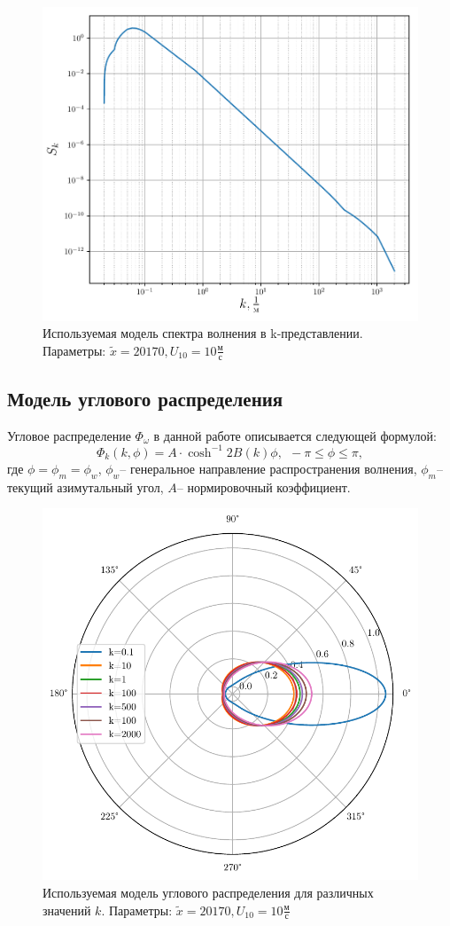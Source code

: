 \begin{figure}[h!]
	\centering
	\includegraphics[width=0.7\linewidth]{fig/full_spectrum}
	\caption{Используемая модель спектра волнения в k-представлении. 
	Параметры: $\tilde x=20170, U_{10}=10 \frac{\text{м}}{\text{с}}$}
	\label{fig:full_spectrum}
\end{figure}
\subsection{Модель углового распределения}
Угловое распределение $\Phi_{\omega}$ в данной работе описывается следующей формулой:
\begin{equation}
	\Phi_{k} (k, \phi)= A\cdot \cosh^{-1}{2B(k) \phi}, ~~ -\pi\leq \phi \leq \pi,
\end{equation}
где $\phi=\phi_m = \phi_w$, $\phi_w$-- генеральное направление распространения волнения,
$\phi_m$-- текущий азимутальный угол, $A$-- нормировочный коэффициент.


\begin{figure}[h!]
	\centering
	\includegraphics[width=0.7\linewidth]{fig/full_angles}
	\caption{Используемая модель  углового распределения для различных значений $k$. 
	Параметры: $\tilde x=20170, U_{10}=10 \frac{\text{м}}{\text{с}}$}
	\label{fig:full_spectrum}
\end{figure}


